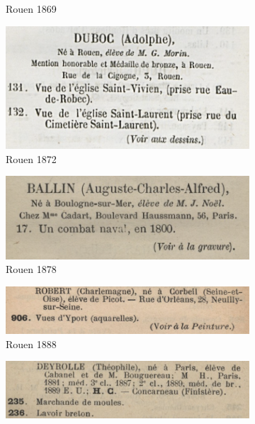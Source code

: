 \documentclass[a4paper,12pt,twoside]{book}
\begin{document}
\begin{figure}
\begin{subfigure}{0.5\textwidth}
		\centering
		\caption{Rouen 1869}
	\end{subfigure}
		\begin{subfigure}{0.5\textwidth}
		\includegraphics[scale=0.5]{rouen1872.png}
		\centering
		\caption{Rouen 1872}
	\end{subfigure}
		\begin{subfigure}{0.5\textwidth}
		\includegraphics[scale=0.5]{rouen1878.png}
		\centering
		\caption{Rouen 1878}
	\end{subfigure}
		\begin{subfigure}{0.5\textwidth}
		\includegraphics[scale=0.5]{rouen1888.png}
		\centering
		\caption{Rouen 1888}
	\end{subfigure}
		\begin{subfigure}{0.5\textwidth}
		\includegraphics[scale=0.5]{rouen1891.png}

\end{subfigure}
\end{figure}
\end{document}
